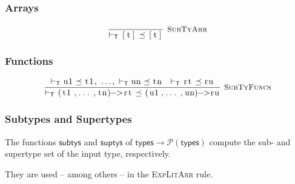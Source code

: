 \documentclass{article}
\newcommand{\code}[1]{\lstinline[columns=fixed]{#1}}
\newcommand{\drmrule}[5]{\frac{#1}{#2\vdash_{\mathsf{#3}}#4}\textsc{\ \small{#5}}}
\newcommand{\ruleapp}[1]{\vdash_{\mathsf{#1}}}
\newcommand{\mc}[1]{\textnormal{\code{#1}}}
\begin{document}
			\subsubsection{Arrays}
			
				\begin{align*}
					\drmrule{}{}{T}{\mc{[t]}\preceq\mc{[t]}}{SubTyArr}
				\end{align*}
		
			\subsubsection{Functions}
			
				\begin{align*}
					\drmrule{\ruleapp{T}\mc{u1}\preceq\mc{t1},\ \dots,\ \ruleapp{T}\mc{un}\preceq\mc{tn}\ \ \ruleapp{T}\mc{rt}\preceq\mc{ru}}{}{T}{\mc{(t1,...,tn)->rt} \preceq \mc{(u1,...,un)->ru}}{SubTyFuncs}
				\end{align*}
				
			\subsubsection{Subtypes and Supertypes}
			
				The functions $\mathsf{subtys}$ and $\mathsf{suptys}$ of $\mathsf{types}\to\mathcal{P}(\mathsf{types})$ compute the sub- and supertype set of the input type, respectively.
				
				They are used -- among others -- in the \textsc{ExpLitArr} rule.
				
\end{document}
